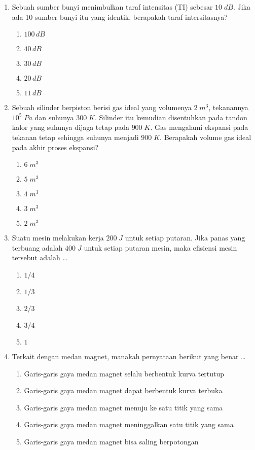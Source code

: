 \documentclass[A4,12PT, english, twocolumn]{journal}
\begin{document}
\begin{enumerate}
\item Sebuah sumber bunyi menimbulkan taraf intensitas (TI) sebesar $10 \; dB$. Jika ada 10 sumber bunyi itu yang identik, berapakah taraf intersitasnya?
    \begin{enumerate}
        \item $100 \, dB$
        \item $40 \, dB$
        \item $30 \, dB$
        \item $20 \, dB$
        \item $11 \, dB$
    \end{enumerate}
    
\item Sebuah silinder berpiston berisi gas ideal yang volumenya $2 \; m^3$, tekanannya $10^5 \; Pa$ dan suhunya $300 \; K$. Silinder itu kemudian disentuhkan pada tandon kalor yang suhunya dijaga tetap pada $900 \; K$. Gas mengalami ekspansi pada tekanan tetap sehingga suhunya menjadi $900 \; K$. Berapakah volume gas ideal pada akhir proses ekspansi?
    \begin{enumerate}
        \item $6 \; m^3$
        \item $5 \; m^3$
        \item $4 \; m^3$
        \item $3 \; m^3$
        \item $2 \; m^3$
    \end{enumerate}
    
\item Suatu mesin melakukan kerja $200 \; J$ untuk setiap putaran. Jika panas yang terbuang adalah $400 \; J$ untuk setiap putaran mesin, maka efisiensi mesin tersebut adalah \dots
    \begin{enumerate}
        \item $1/4$
        \item $1/3$
        \item $2/3$
        \item $3/4$
        \item $1$
    \end{enumerate}
    
\item Terkait dengan medan magnet, manakah pernyataan berikut yang benar \dots
	\begin{enumerate}
		\item Garis-garis gaya medan magnet selalu berbentuk kurva tertutup
		\item Garis-garis gaya medan magnet dapat berbentuk kurva terbuka
		\item Garis-garis gaya medan magnet menuju ke satu titik yang sama
		\item Garis-garis gaya medan magnet meninggalkan satu titik yang sama
		\item Garis-garis gaya medan magnet bisa saling berpotongan
	\end{enumerate}
	

\end{enumerate}
\end{document}
